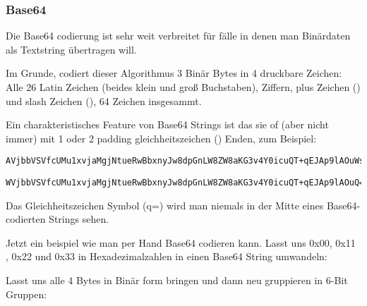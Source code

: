 \subsubsection{Base64}

Die Base64 codierung ist sehr weit verbreitet für fälle in denen man Binärdaten als Textstring übertragen will.

Im Grunde, codiert dieser Algorithmus 3 Binär Bytes in 4 druckbare Zeichen: 
Alle 26 Latin Zeichen (beides klein und groß Buchstaben), Ziffern, plus Zeichen (\q{+}) und slash Zeichen (\q{/}),
64 Zeichen insgesammt. 


Ein charakteristisches Feature von Base64 Strings ist das sie of (aber nicht immer) mit 1 oder 2  \gls{padding}
gleichheitszeichen (\q{=}) Enden, zum Beispiel: 


\begin{lstlisting}
AVjbbVSVfcUMu1xvjaMgjNtueRwBbxnyJw8dpGnLW8ZW8aKG3v4Y0icuQT+qEJAp9lAOuWs=
\end{lstlisting}

\begin{lstlisting}
WVjbbVSVfcUMu1xvjaMgjNtueRwBbxnyJw8dpGnLW8ZW8aKG3v4Y0icuQT+qEJAp9lAOuQ==
\end{lstlisting}

Das Gleichheitszeichen Symbol (q{=}) wird man niemals in der Mitte eines Base64-codierten
Strings sehen.

Jetzt ein beispiel wie man per Hand Base64 codieren kann.
Lasst uns 0x00, 0x11 , 0x22 und 0x33 in Hexadezimalzahlen in einen Base64
String umwandeln: 




Lasst uns alle 4 Bytes in Binär form bringen und dann neu gruppieren in 6-Bit Gruppen:

